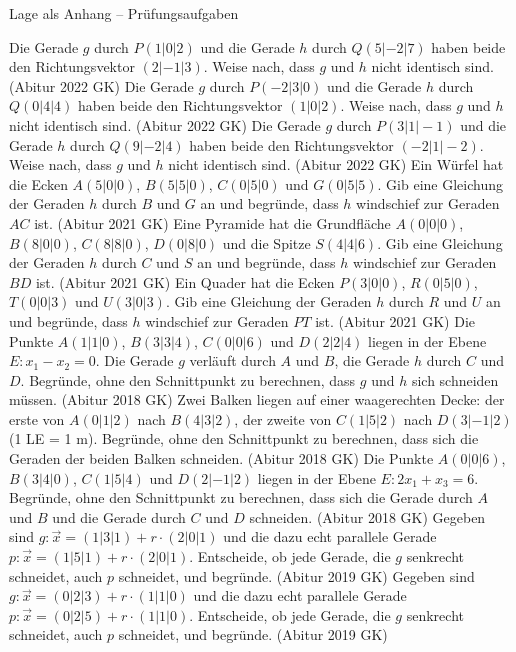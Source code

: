 \begin{aufgabe}{Lage als Anhang – Prüfungsaufgaben}
\begin{teile}
\teil Die Gerade $g$ durch $P(1 | 0 | 2)$ und die Gerade $h$ durch $Q(5 | -2 | 7)$ haben beide den Richtungsvektor $(2 | -1 | 3)$. Weise nach, dass $g$ und $h$ nicht identisch sind. \hfill (Abitur 2022 GK)
\teil Die Gerade $g$ durch $P(-2 | 3 | 0)$ und die Gerade $h$ durch $Q(0 | 4 | 4)$ haben beide den Richtungsvektor $(1 | 0 | 2)$. Weise nach, dass $g$ und $h$ nicht identisch sind. \hfill (Abitur 2022 GK)
\teil Die Gerade $g$ durch $P(3 | 1 | -1)$ und die Gerade $h$ durch $Q(9 | -2 | 4)$ haben beide den Richtungsvektor $(-2 | 1 | -2)$. Weise nach, dass $g$ und $h$ nicht identisch sind. \hfill (Abitur 2022 GK)
\teil Ein Würfel hat die Ecken $A(5 | 0 | 0)$, $B(5 | 5 | 0)$, $C(0 | 5 | 0)$ und $G(0 | 5 | 5)$. Gib eine Gleichung der Geraden $h$ durch $B$ und $G$ an und begründe, dass $h$ windschief zur Geraden $AC$ ist. \hfill (Abitur 2021 GK)
\teil Eine Pyramide hat die Grundfläche $A(0 | 0 | 0)$, $B(8 | 0 | 0)$, $C(8 | 8 | 0)$, $D(0 | 8 | 0)$ und die Spitze $S(4 | 4 | 6)$. Gib eine Gleichung der Geraden $h$ durch $C$ und $S$ an und begründe, dass $h$ windschief zur Geraden $BD$ ist. \hfill (Abitur 2021 GK)
\teil Ein Quader hat die Ecken $P(3 | 0 | 0)$, $R(0 | 5 | 0)$, $T(0 | 0 | 3)$ und $U(3 | 0 | 3)$. Gib eine Gleichung der Geraden $h$ durch $R$ und $U$ an und begründe, dass $h$ windschief zur Geraden $PT$ ist. \hfill (Abitur 2021 GK)
\teil Die Punkte $A(1 | 1 | 0)$, $B(3 | 3 | 4)$, $C(0 | 0 | 6)$ und $D(2 | 2 | 4)$ liegen in der Ebene $E\colon x_1 - x_2 = 0$. Die Gerade $g$ verläuft durch $A$ und $B$, die Gerade $h$ durch $C$ und $D$. Begründe, ohne den Schnittpunkt zu berechnen, dass $g$ und $h$ sich schneiden müssen. \hfill (Abitur 2018 GK)
\teil Zwei Balken liegen auf einer waagerechten Decke: der erste von $A(0 | 1 | 2)$ nach $B(4 | 3 | 2)$, der zweite von $C(1 | 5 | 2)$ nach $D(3 | -1 | 2)$ (1 LE = 1 m). Begründe, ohne den Schnittpunkt zu berechnen, dass sich die Geraden der beiden Balken schneiden. \hfill (Abitur 2018 GK)
\teil Die Punkte $A(0 | 0 | 6)$, $B(3 | 4 | 0)$, $C(1 | 5 | 4)$ und $D(2 | -1 | 2)$ liegen in der Ebene $E\colon 2x_1 + x_3 = 6$. Begründe, ohne den Schnittpunkt zu berechnen, dass sich die Gerade durch $A$ und $B$ und die Gerade durch $C$ und $D$ schneiden. \hfill (Abitur 2018 GK)
\teil Gegeben sind $g\colon \vec x = (1 | 3 | 1) + r \cdot (2 | 0 | 1)$ und die dazu echt parallele Gerade $p\colon \vec x = (1 | 5 | 1) + r \cdot (2 | 0 | 1)$. Entscheide, ob jede Gerade, die $g$ senkrecht schneidet, auch $p$ schneidet, und begründe. \hfill (Abitur 2019 GK)
\teil Gegeben sind $g\colon \vec x = (0 | 2 | 3) + r \cdot (1 | 1 | 0)$ und die dazu echt parallele Gerade $p\colon \vec x = (0 | 2 | 5) + r \cdot (1 | 1 | 0)$. Entscheide, ob jede Gerade, die $g$ senkrecht schneidet, auch $p$ schneidet, und begründe. \hfill (Abitur 2019 GK)
\end{teile}
\end{aufgabe}

